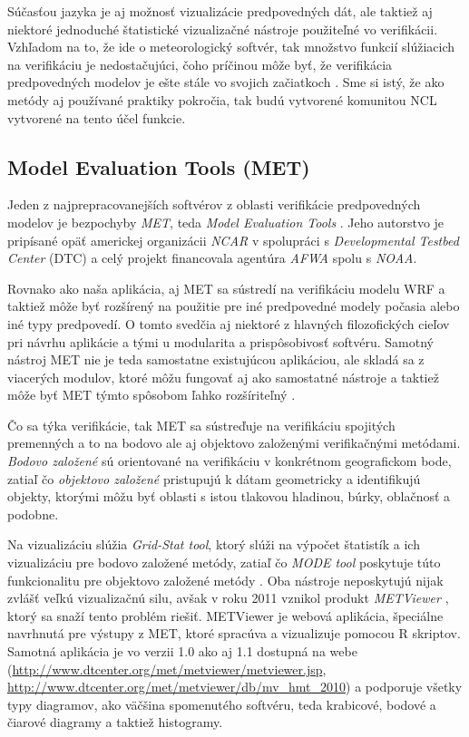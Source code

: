 Súčasťou jazyka je aj možnosť vizualizácie predpovedných dát, ale taktiež aj niektoré jednoduché štatistické vizualizačné nástroje použiteľné vo verifikácii. Vzhľadom na to, že ide o meteorologický softvér, tak množstvo funkcií slúžiacich na verifikáciu je nedostačujúci, čoho príčinou môže byť, že verifikácia predpovedných modelov je ešte stále vo svojich začiatkoch \cite{VerifSoft}. Sme si istý, že ako metódy aj používané praktiky pokročia, tak budú vytvorené komunitou NCL vytvorené na tento účel funkcie.

\subsection[MET]{Model Evaluation Tools (MET)}
Jeden z najprepracovanejších softvérov z oblasti verifikácie predpovedných modelov je bezpochyby \textit{MET}, teda \textit{Model Evaluation Tools} \cite{MET}. Jeho autorstvo je pripísané opäť americkej organizácii \textit{NCAR} v spolupráci s \textit{Developmental Testbed Center} (DTC) a celý projekt financovala agentúra \textit{AFWA} spolu s \textit{NOAA}.

Rovnako ako naša aplikácia, aj MET sa sústredí na verifikáciu modelu WRF a taktiež môže byť rozšírený na použitie pre iné predpovedné modely počasia alebo iné typy predpovedí. O tomto svedčia aj niektoré z hlavných filozofických cieľov pri návrhu aplikácie a tými u modularita a prispôsobivosť softvéru. Samotný nástroj MET nie je teda samostatne existujúcou aplikáciou, ale skladá sa z viacerých modulov, ktoré môžu fungovať aj ako samostatné nástroje a taktiež môže byť MET týmto spôsobom ľahko rozšíriteľný \cite{METuserguide}. 

Čo sa týka verifikácie, tak MET sa sústreďuje na verifikáciu spojitých premenných a to na bodovo ale aj objektovo založenými verifikačnými metódami. \textit{Bodovo založené} sú orientované na verifikáciu v konkrétnom geografickom bode, zatiaľ čo \textit{objektovo založené} pristupujú k dátam geometricky a identifikujú objekty, ktorými môžu byť oblasti s istou tlakovou hladinou, búrky, oblačnosť a podobne.

Na vizualizáciu slúžia \textit{Grid-Stat tool}, ktorý slúži na výpočet štatistík a ich vizualizáciu pre bodovo založené metódy, zatiaľ čo \textit{MODE tool} poskytuje túto funkcionalitu pre objektovo založené metódy \cite{METuserguide}. Oba nástroje neposkytujú nijak zvlášť veľkú vizualizačnú silu, avšak v roku 2011 vznikol produkt \textit{METViewer} \cite{METviewer}, ktorý sa snaží tento problém riešiť. METViewer je webová aplikácia, špeciálne navrhnutá pre výstupy z MET, ktoré spracúva a vizualizuje pomocou R skriptov.  Samotná aplikácia je vo verzii 1.0 ako aj 1.1 dostupná na webe (\url{http://www.dtcenter.org/met/metviewer/metviewer.jsp},  \url{http://www.dtcenter.org/met/metviewer/db/mv_hmt_2010}) a podporuje všetky typy diagramov, ako väčšina spomenutého softvéru, teda krabicové, bodové a čiarové diagramy a taktiež histogramy.

